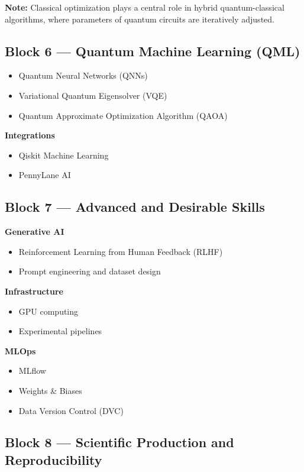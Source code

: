 \documentclass[a4paper,12pt]{book}
\begin{document}
\textbf{Note:} Classical optimization plays a central role in hybrid quantum-classical algorithms, where parameters of quantum circuits are iteratively adjusted.

\subsection*{Block 6 — Quantum Machine Learning (QML)}

\begin{itemize}
    \item Quantum Neural Networks (QNNs)
    \item Variational Quantum Eigensolver (VQE)
    \item Quantum Approximate Optimization Algorithm (QAOA)
\end{itemize}

\textbf{Integrations}
\begin{itemize}
    \item Qiskit Machine Learning
    \item PennyLane AI
\end{itemize}

\subsection*{Block 7 — Advanced and Desirable Skills}

\textbf{Generative AI}
\begin{itemize}
    \item Reinforcement Learning from Human Feedback (RLHF)
    \item Prompt engineering and dataset design
\end{itemize}

\textbf{Infrastructure}
\begin{itemize}
    \item GPU computing
    \item Experimental pipelines
\end{itemize}

\textbf{MLOps}
\begin{itemize}
    \item MLflow
    \item Weights \& Biases
    \item Data Version Control (DVC)
\end{itemize}

\subsection*{Block 8 — Scientific Production and Reproducibility}
\end{document}
